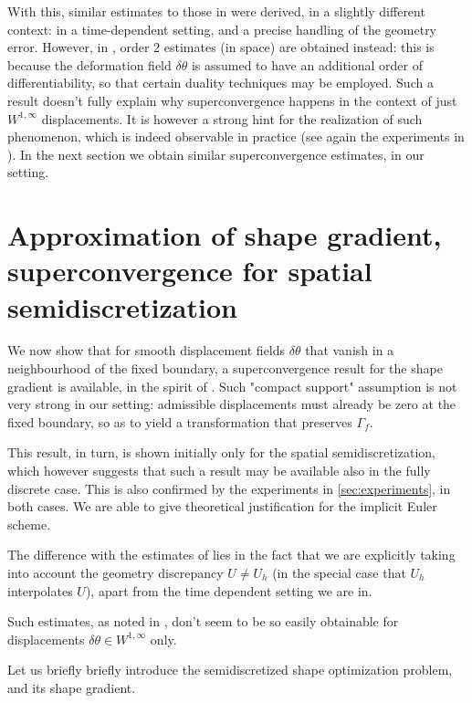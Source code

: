 \documentclass[english,a4paper,9pt,oneside]{scrbook}	%
\theoremstyle{break}
\theoremstyle{remark}
\newcommand{\te}{\theta}
\begin{document}
With this, similar estimates to those in \cite{paganini} were derived, in a slightly different context: in a time-dependent setting, and a precise handling of the geometry error. However, in \cite{paganini}, order $2$ estimates (in space) are obtained instead: this is because the deformation field $\delta \te$ is assumed to have an additional order of differentiability, so that certain duality techniques may be employed. Such a result doesn't fully explain why superconvergence happens in the context of just $W^{1,\infty}$ displacements. It is however a strong hint for the realization of such phenomenon, which is indeed observable in practice (see again the experiments in \cite{paganini}). In the next section we obtain similar superconvergence estimates, in our setting.


\section{Approximation of shape gradient, superconvergence for spatial semidiscretization}
\label{sec:superconv}

We now show that for smooth displacement fields $\delta \te$ that vanish in a neighbourhood of the fixed boundary, a superconvergence result for the shape gradient is available, in the spirit of \cite{paganini}. Such "compact support" assumption is not very strong in our setting: admissible displacements must already be zero at the fixed boundary, so as to yield a transformation that preserves $\Gamma_f$.

This result, in turn, is shown initially only for the spatial semidiscretization, which however suggests that such a result may be available also in the fully discrete case. This is also confirmed by the experiments in \ref{sec:experiments}, in both cases. We are able to give theoretical justification for the implicit Euler scheme.

The difference with the estimates of \cite{paganini} lies in the fact that we are explicitly taking into account the geometry discrepancy $U \neq U_h$ (in the special case that $U_h$ interpolates $U$), apart from the time dependent setting we are in.

Such estimates, as noted in \cite{paganini}, don't seem to be so easily obtainable for displacements $\delta \te \in W^{1,\infty}$ only.

Let us briefly briefly introduce the semidiscretized shape optimization problem, and its shape gradient.
\end{document}
